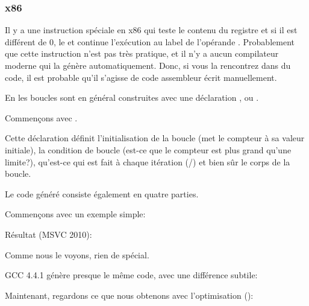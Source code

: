 \subsubsection{x86}


Il y a une instruction \LOOP spéciale en x86 qui teste le contenu du registre \ECX
et si il est différent de 0, le  et continue l'exécution
au label de l'opérande \LOOP.
Probablement que cette instruction n'est pas très pratique, et il n'y a aucun compilateur
moderne qui la génère automatiquement.
Donc, si vous la rencontrez dans du code, il est probable qu'il s'agisse de code
assembleur écrit manuellement.

\par

En \CCpp les boucles sont en général construites avec une déclaration ,
 ou .

Commençons avec .

Cette déclaration définit l'initialisation de la boucle (met le compteur à sa valeur
initiale), la condition de boucle (est-ce que le compteur est plus grand qu'une limite?),
qu'est-ce qui est fait à chaque itération (/)
et bien sûr le corps de la boucle.



Le code généré consiste également en quatre parties.

Commençons avec un exemple simple:



Résultat (MSVC 2010):



Comme nous le voyons, rien de spécial.

GCC 4.4.1 génère presque le même code, avec une différence subtile:



Maintenant, regardons ce que nous obtenons avec l'optimisation  (\TT{\Ox}):



